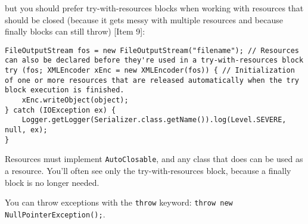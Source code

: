 \documentclass[8pt, table, xcdraw]{article}%
\begin{document}
but you should prefer try-with-resources blocks when working with resources that should be closed (because it gets messy with multiple resources and because finally blocks can still throw) [Item 9]:

\begin{lstlisting}
FileOutputStream fos = new FileOutputStream("filename"); // Resources can also be declared before they're used in a try-with-resources block
try (fos; XMLEncoder xEnc = new XMLEncoder(fos)) { // Initialization of one or more resources that are released automatically when the try block execution is finished.
    xEnc.writeObject(object);
} catch (IOException ex) {
    Logger.getLogger(Serializer.class.getName()).log(Level.SEVERE, null, ex);
}
\end{lstlisting}

Resources must implement \lstinline{AutoClosable}, and any class that does can be used as a resource. You'll often see only the try-with-resources block, because a finally block is no longer needed.

You can throw exceptions with the \lstinline{throw} keyword: \lstinline{throw new NullPointerException();}.
\end{document}
